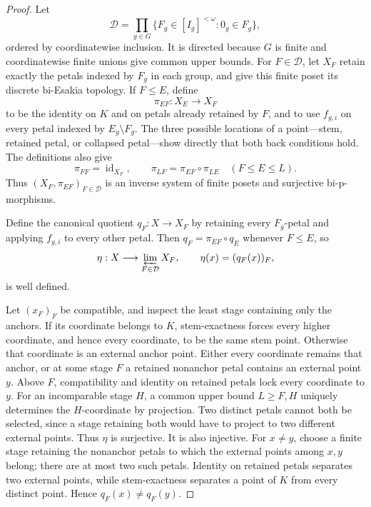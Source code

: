 \documentclass[11pt]{article}
\theoremstyle{remark}
\numberwithin{equation}{section}
\begin{document}
\begin{proof}
Let
\begin{equation}
\mathcal D=
\prod_{g\in G}
\{F_g\in[I_g]^{<\omega}:0_g\in F_g\},
\label{eq:directed-set}
\end{equation}
ordered by coordinatewise inclusion. It is directed because $G$ is finite and
coordinatewise finite unions give common upper bounds. For $F\in\mathcal D$,
let $X_F$ retain exactly the petals indexed by $F_g$ in each group, and give
this finite poset its discrete bi-Esakia topology. If $F\leq E$, define
\begin{equation}
\pi_{EF}:X_E\longrightarrow X_F
\label{eq:bonding}
\end{equation}
to be the identity on $K$ and on petals already retained by $F$, and to use
$f_{g,i}$ on every petal indexed by $E_g\setminus F_g$. The three possible
locations of a point---stem, retained petal, or collapsed petal---show directly
that both back conditions hold. The definitions also give
\begin{equation}
\pi_{FF}=\operatorname{id}_{X_F},
\qquad
\pi_{LF}=\pi_{EF}\circ\pi_{LE}
\quad(F\leq E\leq L).
\label{eq:coherence}
\end{equation}
Thus $(X_F,\pi_{EF})_{F\in\mathcal D}$ is an inverse system of finite posets and
surjective bi-p-morphisms.

Define the canonical quotient $q_F:X\to X_F$ by retaining every $F_g$-petal
and applying $f_{g,i}$ to every other petal. Then
$q_F=\pi_{EF}\circ q_E$ whenever $F\leq E$, so
\begin{equation}
\eta:X\longrightarrow\varprojlim_{F\in\mathcal D}X_F,
\qquad
\eta(x)=(q_F(x))_F,
\label{eq:eta}
\end{equation}
is well defined.

Let $(x_F)_F$ be compatible, and inspect the least stage containing only the
anchors. If its coordinate belongs to $K$, stem-exactness forces every higher
coordinate, and hence every coordinate, to be the same stem point. Otherwise
that coordinate is an external anchor point. Either every coordinate remains
that anchor, or at some stage $F$ a retained nonanchor petal contains an
external point $y$. Above $F$, compatibility and identity on retained petals
lock every coordinate to $y$. For an incomparable stage $H$, a common upper
bound $L\geq F,H$ uniquely determines the $H$-coordinate by projection. Two
distinct petals cannot both be selected, since a stage retaining both would
have to project to two different external points. Thus $\eta$ is surjective.
It is also injective. For $x\ne y$, choose a finite stage retaining the
nonanchor petals to which the external points among $x,y$ belong; there are at
most two such petals. Identity on retained petals separates two external
points, while stem-exactness separates a point of $K$ from every distinct
point. Hence $q_F(x)\ne q_F(y)$.


\end{proof}
\end{document}
